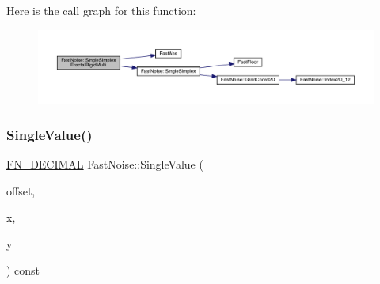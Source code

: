 Here is the call graph for this function\+:
\nopagebreak
\begin{figure}[H]
\begin{center}
\leavevmode
\includegraphics[width=350pt]{class_fast_noise_a6a1e4725751d679b33705fa5867f7525_cgraph}
\end{center}
\end{figure}
\mbox{\label{class_fast_noise_a9704c1a9f62ad5fcf8e42b15ad8df389}} 
\subsubsection{\texorpdfstring{Single\+Value()}{SingleValue()}\hspace{0.1cm}{\footnotesize\ttfamily [1/2]}}
{\footnotesize\ttfamily \mbox{\hyperlink{_fast_noise_8h_a75a9ef6d2541c4921815b885bfd449c3}{F\+N\+\_\+\+D\+E\+C\+I\+M\+AL}} Fast\+Noise\+::\+Single\+Value (\begin{DoxyParamCaption}\item[{unsigned char}]{offset,  }\item[{\mbox{\hyperlink{_fast_noise_8h_a75a9ef6d2541c4921815b885bfd449c3}{F\+N\+\_\+\+D\+E\+C\+I\+M\+AL}}}]{x,  }\item[{\mbox{\hyperlink{_fast_noise_8h_a75a9ef6d2541c4921815b885bfd449c3}{F\+N\+\_\+\+D\+E\+C\+I\+M\+AL}}}]{y }\end{DoxyParamCaption}) const\hspace{0.3cm}{\ttfamily [private]}}


